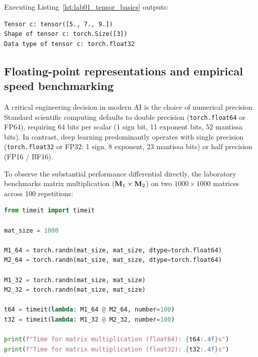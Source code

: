 \documentclass[../labs.tex]{subfiles}
\begin{document}
Executing Listing~\ref{lst:lab01_tensor_basics} outputs:
\begin{lstlisting}[style=terminalOutput]
Tensor c: tensor([5., 7., 9.])
Shape of tensor c: torch.Size([3])
Data type of tensor c: torch.float32
\end{lstlisting}

\subsection{Floating-point representations and empirical speed benchmarking}
A critical engineering decision in modern AI is the choice of numerical precision. Standard scientific computing defaults to double precision (\texttt{torch.float64} or FP64), requiring 64 bits per scalar (1 sign bit, 11 exponent bits, 52 mantissa bits). In contrast, deep learning predominantly operates with single precision (\texttt{torch.float32} or FP32: 1 sign, 8 exponent, 23 mantissa bits) or half precision (FP16 / BF16).

To observe the substantial performance differential directly, the laboratory benchmarks matrix multiplication ($\mathbf{M}_1 \times \mathbf{M}_2$) on two $1000 \times 1000$ matrices across 100 repetitions:

\begin{lstlisting}[language=Python, caption={Empirical matrix multiplication benchmark comparing FP64 and FP32 (Cell 6).}, label={lst:lab01_speed_benchmark}]
from timeit import timeit

mat_size = 1000

M1_64 = torch.randn(mat_size, mat_size, dtype=torch.float64)
M2_64 = torch.randn(mat_size, mat_size, dtype=torch.float64)

M1_32 = torch.randn(mat_size, mat_size)
M2_32 = torch.randn(mat_size, mat_size)

t64 = timeit(lambda: M1_64 @ M2_64, number=100)
t32 = timeit(lambda: M1_32 @ M2_32, number=100)

print(f"Time for matrix multiplication (float64): {t64:.4f}s")
print(f"Time for matrix multiplication (float32): {t32:.4f}s")
\end{lstlisting}
\end{document}
